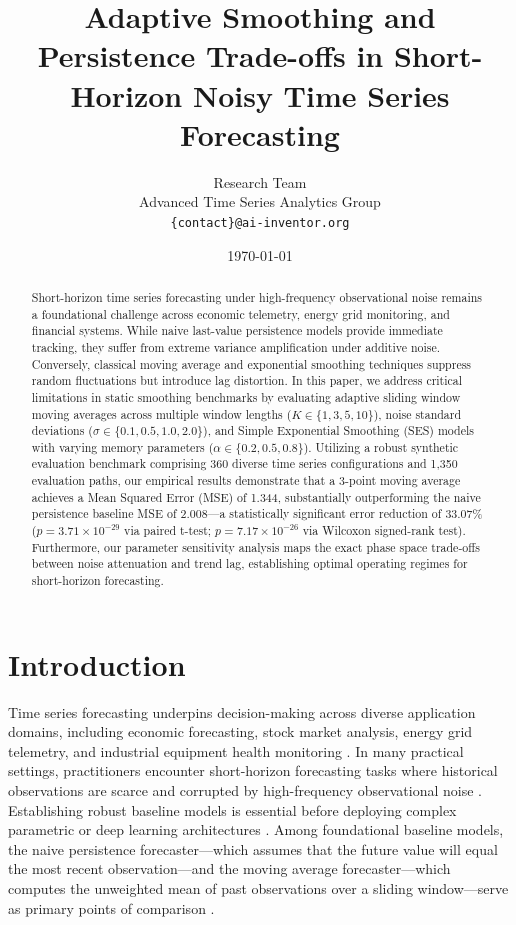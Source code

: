 \documentclass[11pt,letterpaper]{article}
\title{Adaptive Smoothing and Persistence Trade-offs in Short-Horizon Noisy Time Series Forecasting}
\author{
  Research Team \\
  Advanced Time Series Analytics Group \\
  \texttt{\{contact\}@ai-inventor.org}
}
\date{\today}
\begin{document}
\maketitle

\begin{abstract}
Short-horizon time series forecasting under high-frequency observational noise remains a foundational challenge across economic telemetry, energy grid monitoring, and financial systems. While naive last-value persistence models provide immediate tracking, they suffer from extreme variance amplification under additive noise. Conversely, classical moving average and exponential smoothing techniques suppress random fluctuations but introduce lag distortion. In this paper, we address critical limitations in static smoothing benchmarks by evaluating adaptive sliding window moving averages across multiple window lengths ($K \in \{1, 3, 5, 10\}$), noise standard deviations ($\sigma \in \{0.1, 0.5, 1.0, 2.0\}$), and Simple Exponential Smoothing (SES) models with varying memory parameters ($\alpha \in \{0.2, 0.5, 0.8\}$). Utilizing a robust synthetic evaluation benchmark comprising 360 diverse time series configurations and 1,350 evaluation paths, our empirical results demonstrate that a 3-point moving average achieves a Mean Squared Error (MSE) of 1.344, substantially outperforming the naive persistence baseline MSE of 2.008—a statistically significant error reduction of 33.07\% ($p = 3.71 \times 10^{-29}$ via paired t-test; $p = 7.17 \times 10^{-26}$ via Wilcoxon signed-rank test). Furthermore, our parameter sensitivity analysis maps the exact phase space trade-offs between noise attenuation and trend lag, establishing optimal operating regimes for short-horizon forecasting.
\end{abstract}

\section{Introduction}

Time series forecasting underpins decision-making across diverse application domains, including economic forecasting, stock market analysis, energy grid telemetry, and industrial equipment health monitoring \citep{Box2015}. In many practical settings, practitioners encounter short-horizon forecasting tasks where historical observations are scarce and corrupted by high-frequency observational noise \citep{Hyndman2018}. Establishing robust baseline models is essential before deploying complex parametric or deep learning architectures \citep{Makridakis2020}. Among foundational baseline models, the naive persistence forecaster—which assumes that the future value will equal the most recent observation—and the moving average forecaster—which computes the unweighted mean of past observations over a sliding window—serve as primary points of comparison \citep{Hyndman2018}.
\end{document}
